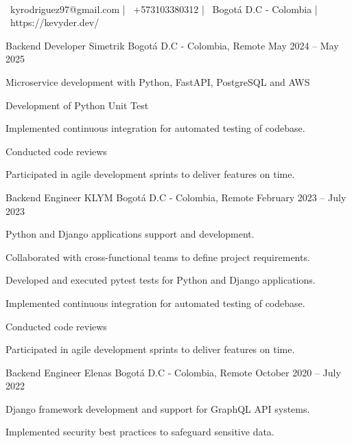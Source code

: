 \documentclass[]{awesome-cv}
\begin{document}
    
\begin{center}
	  \\
	\vspace{2mm}
	{\faEnvelope\ kyrodriguez97@gmail.com} | {\faMobile\ +573103380312} | {\faMapMarker\ Bogotá D.C - Colombia} | {\faLink\ https://kevyder.dev/}
\end{center}
\begin{cventries}
	\cventry
	{Backend Developer}
	{Simetrik}
	{Bogotá D.C - Colombia, Remote}
	{May 2024 – May 2025}
	{\begin{cvitems}
		\item {Microservice development with Python, FastAPI, PostgreSQL and AWS}
		\item {Development of Python Unit Test}
		\item {Implemented continuous integration for automated testing of codebase.}
		\item {Conducted code reviews}
		\item {Participated in agile development sprints to deliver features on time.}
		\end{cvitems}}
	\cventry
	{Backend Engineer}
	{KLYM}
	{Bogotá D.C - Colombia, Remote}
	{February 2023 – July 2023}
	{\begin{cvitems}
		\item {Python and Django applications support and development.}
		\item {Collaborated with cross-functional teams to define project requirements.}
		\item {Developed and executed pytest tests for Python and Django applications.}
		\item {Implemented continuous integration for automated testing of codebase.}
		\item {Conducted code reviews}
		\item {Participated in agile development sprints to deliver features on time.}
		\end{cvitems}}
	\cventry
	{Backend Engineer}
	{Elenas}
	{Bogotá D.C - Colombia, Remote}
	{October 2020 – July 2022}
	{\begin{cvitems}
		\item {Django framework development and support for GraphQL API systems.}
		\item {Implemented security best practices to safeguard sensitive data.}

\end{cvitems}}
\end{cventries}
\end{document}
